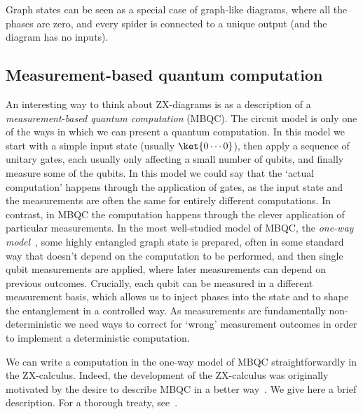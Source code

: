 \documentclass[a4paper,onecolumn,superscriptaddress,11pt,%
				unpublished,%
				allowfontchageintitle,%
				]{quantumarticle}
\begin{document}
Graph states can be seen as a special case of graph-like diagrams, where all the phases are zero, and every spider is connected to a unique output (and the diagram has no inputs).


\subsection{Measurement-based quantum computation}\label{sec:MBQC}

An interesting way to think about ZX-diagrams is as a description of a \emph{measurement-based quantum computation} (MBQC).
The circuit model is only one of the ways in which we can present a quantum computation. In this model we start with a simple input state (usually $\ket{0\cdots 0}$), then apply a sequence of unitary gates, each usually only affecting a small number of qubits, and finally measure some of the qubits.
In this model we could say that the `actual computation' happens through the application of gates, as the input state and the measurements are often the same for entirely different computations.
In contrast, in MBQC the computation happens through the clever application of particular measurements. In the most well-studied model of MBQC, the \emph{one-way model}~\cite{MBQC1}, some highly entangled graph state is prepared, often in some standard way that doesn't depend on the computation to be performed, and then single qubit measurements are applied, where later measurements can depend on previous outcomes. 
Crucially, each qubit can be measured in a different measurement basis, which allows us to inject phases into the state and to shape the entanglement in a controlled way. As measurements are fundamentally non-deterministic we need ways to correct for `wrong' measurement outcomes in order to implement a deterministic computation.

We can write a computation in the one-way model of MBQC straightforwardly in the ZX-calculus. Indeed, the development of the ZX-calculus was originally motivated by the desire to describe MBQC in a better way~\cite{DuncanMBQC}. We give here a brief description. For a thorough treaty, see~\cite{wetering-gflow}. 
\end{document}
